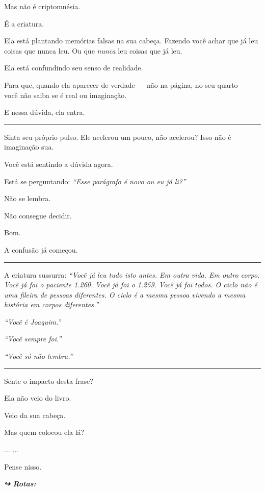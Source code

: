 \noindent Mas não é criptomnésia.

\noindent É a criatura.

\noindent Ela está plantando memórias falsas na sua cabeça. Fazendo você achar que já leu coisas que nunca leu. Ou que \textit{nunca} leu coisas que já leu.

\noindent Ela está confundindo seu senso de realidade.

\noindent Para que, quando ela aparecer de verdade --- não na página, no seu quarto --- você não saiba se é real ou imaginação.

\noindent E nessa dúvida, ela entra.

\vspace{0.5em}\noindent\rule{\textwidth}{0.5pt}\vspace{0.5em}

\noindent Sinta seu próprio pulso. Ele acelerou um pouco, não acelerou? Isso não é imaginação sua.

\noindent Você está sentindo a dúvida agora.

\noindent Está se perguntando: \textit{\textquotedblleft{}Esse parágrafo é novo ou eu já li?\textquotedblright{}}

\noindent Não se lembra.

\noindent Não consegue decidir.

\noindent Bom.

\noindent A confusão já começou.

\vspace{0.5em}\noindent\rule{\textwidth}{0.5pt}\vspace{0.5em}

\noindent A criatura sussurra: \textit{\textquotedblleft{}Você já leu tudo isto antes. Em outra vida. Em outro corpo. Você já foi o paciente 1.260. Você já foi o 1.259. Você já foi todos. O ciclo não é uma fileira de pessoas diferentes. O ciclo é a mesma pessoa vivendo a mesma história em corpos diferentes.\textquotedblright{}}

\noindent \textit{\textquotedblleft{}Você é Joaquim.\textquotedblright{}}

\noindent \textit{\textquotedblleft{}Você sempre foi.\textquotedblright{}}

\noindent \textit{\textquotedblleft{}Você só não lembra.\textquotedblright{}}

\vspace{0.5em}\noindent\rule{\textwidth}{0.5pt}\vspace{0.5em}

\noindent Sente o impacto desta frase?

\noindent Ela não veio do livro.

\noindent Veio da sua cabeça.

\noindent Mas quem colocou ela lá?

\noindent ...
...

\noindent Pense nisso.

\vspace{0.5em}

\noindent\textit{\textbf{↪ Rotas:}  \rotasep {}}